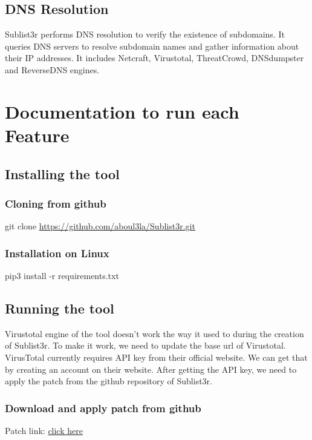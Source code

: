 \documentclass[12pt]{article}
\begin{document}
\subsection{DNS Resolution}\label{subsec:dns-resolution}
Sublist3r performs DNS resolution to verify the existence of subdomains. It queries DNS servers to resolve subdomain names and gather information about their IP addresses. It includes Netcraft, Virustotal, ThreatCrowd, DNSdumpster and ReverseDNS engines.

\section{Documentation to run each Feature}\label{sec:documentation}

\subsection{Installing the tool}\label{subsec:installing-the-tool}
\subsubsection{Cloning from github}\label{subsubsec:cloning-from-github}
git clone \href{https://github.com/aboul3la/Sublist3r.git}{https://github.com/aboul3la/Sublist3r.git}

\subsubsection{Installation on Linux}\label{subsubsec:installation-on-linux}
pip3 install -r requirements.txt

\subsection{Running the tool}\label{subsec:running-the-tool}
Virustotal engine of the tool doesn't work the way it used to during the creation of Sublist3r. To make it work, we need to update the base url of Virustotal. VirusTotal currently requires API key from their official website. We can get that by creating an account on their website. After getting the API key, we need to apply the patch from the github repository of Sublist3r.

\subsubsection{Download and apply patch from github}\label{subsubsec:download-and-apply-patch-from-github}
Patch link: \href{https://github.com/mehedi-imam241/sublist3r_patch_with_API_KEY/blob/main/changes.patch}{click here}
\end{document}
